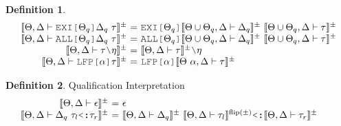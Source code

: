 \documentclass[acmsmall]{acmart}
\theoremstyle{definition}
\newtheorem{definition}{Definition}[section]
\begin{document}
\begin{definition}
\[\begin{array}[t]{r@{}c@{}lcl}
      \llbracket \Theta, \Delta \entails \J{EXI[}\Theta_q\J{]} \Delta_q\ \tau \rrbracket^\pm 
      &\ =\ & 
      \J{EXI[}\Theta_q\J{]} \llbracket \Theta \cup \Theta_q, \Delta \entails \Delta_q \rrbracket^\pm 
      \ \llbracket \Theta \cup \Theta_q, \Delta \entails \tau \rrbracket^{\pm}

      \\

      \llbracket \Theta, \Delta \entails \J{ALL[}\Theta_q\J{]} \Delta_q\ \tau \rrbracket^\pm 
      &\ =\ & 
      \J{ALL[} \Theta_q \J{]} \llbracket \Theta \cup \Theta_q, \Delta \entails \Delta_q \rrbracket^\pm
      \ \llbracket \Theta \cup \Theta_q, \Delta \entails \tau \rrbracket^{\pm}

      \\

      \llbracket \Theta, \Delta \entails \tau \typdiff \eta \rrbracket^\pm 
      &\ =\ & 
      \llbracket \Theta, \Delta \entails \tau \rrbracket^\pm \typdiff \eta

      \\

      \llbracket \Theta, \Delta \entails \J{LFP[}\alpha \J{]} \tau \rrbracket^\pm 
      &\ =\ & 
      \J{LFP[}\alpha \J{]}\llbracket \Theta\ \alpha, \Delta \entails \tau \rrbracket^{\pm}
      \\
  \end{array}
  \]
\end{definition}

\begin{definition} 
  \label{def:qualification_interpretation}
  Qualification Interpretation 
  \hfill
  \small
  \\
  \[
  \begin{array}[t]{r@{}c@{}lcl}
      \llbracket \Theta, \Delta \entails \epsilon \rrbracket^\pm
      &\ =\ & 
      \epsilon
      && 

      \\

      \llbracket \Theta, \Delta \entails \Delta_q \  \tau_l \J{<:} \tau_r \rrbracket^\pm
      &\ =\ & 
      \llbracket \Theta, \Delta \entails \Delta_q\rrbracket^\pm\  
      \llbracket \Theta, \Delta \entails \tau_l \rrbracket^{\text{flip}(\pm)} 
      \J{<:} 
      \llbracket \Theta, \Delta \entails \tau_r \rrbracket^\pm
  \end{array}
  \]
\end{definition} 
\end{document}
